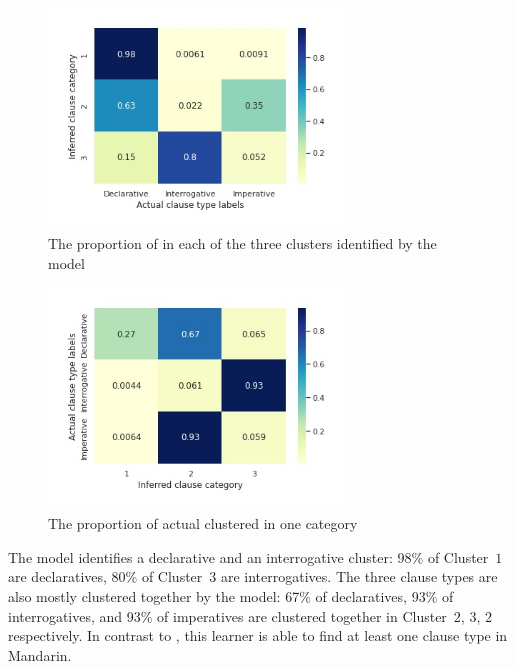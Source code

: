 \begin{figure}[H]
    \centering
    \includegraphics[width=0.7\textwidth]{figures/man-target-mid-heatmap.jpg}
    \caption{The proportion of \diis{} in each of the three clusters identified by the \plearnerabbr{} model}
    \label{fig:man-target-mid-heatmap}
\end{figure}




\begin{figure}[H]
    \centering
    \includegraphics[width=0.7\textwidth]{figures/man-target-mid-heatrev.jpg}
    \caption{The proportion of actual \diis{} clustered in one category}
    \label{fig:man-target-mid-heatrev}
\end{figure}


The \plearnerabbr{} model identifies a declarative and an interrogative cluster: 98\% of Cluster~$1$ are declaratives, 80\% of Cluster~$3$ are interrogatives. The three clause types are also mostly clustered together by the model: 67\% of declaratives, 93\% of interrogatives, and 93\% of imperatives are clustered together in Cluster~$2$, $3$, $2$ respectively. In contrast to \dlearnerabbr{}, this learner is able to find at least one clause type in Mandarin.


